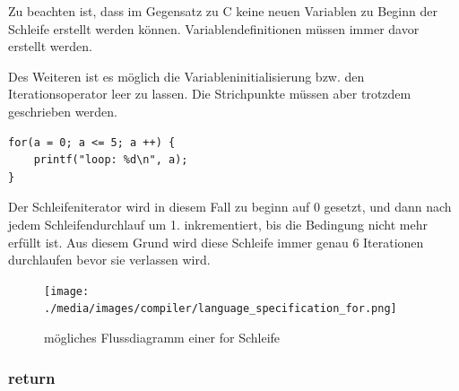 Zu beachten ist, dass im Gegensatz zu C keine neuen Variablen zu Beginn der Schleife erstellt werden k\"onnen. Variablendefinitionen m\"ussen immer davor erstellt werden.

Des Weiteren ist es m\"oglich die Variableninitialisierung bzw. den Iterationsoperator leer zu lassen. Die Strichpunkte m\"ussen aber trotzdem geschrieben werden.


\begin{lstlisting}[language=CMM]
for(a = 0; a <= 5; a ++) {
	printf("loop: %d\n", a);
}
\end{lstlisting}

Der Schleifeniterator wird in diesem Fall zu beginn auf 0 gesetzt, und dann nach jedem Schleifendurchlauf um 1. inkrementiert, bis die Bedingung nicht mehr erf\"ullt ist. Aus diesem Grund wird diese Schleife immer genau 6 Iterationen durchlaufen bevor sie verlassen wird. 

\begin{figure}[h]
\centering
\texttt{[image: ./media/images/compiler/language\_specification\_for.png]}
\caption{m\"ogliches Flussdiagramm einer for Schleife}
\label{language_specification_for}
\end{figure}

\newpage
\subsubsection{return}